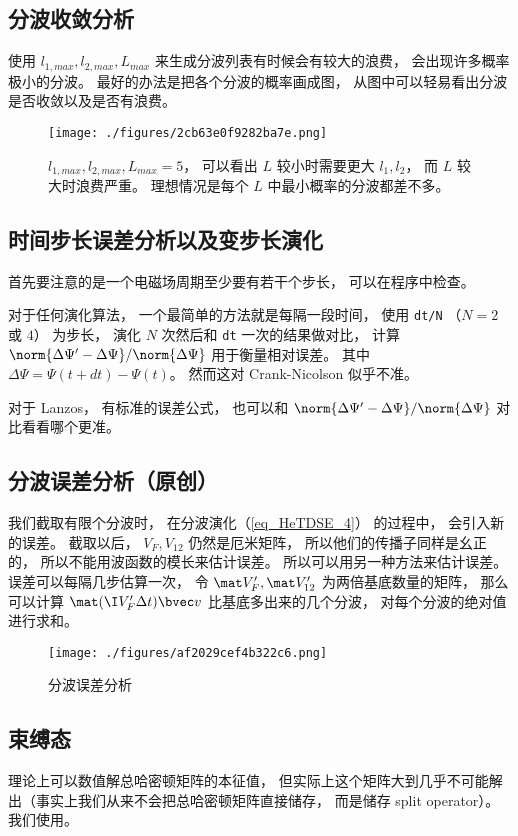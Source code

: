 \subsection{分波收敛分析}
使用 $l_{1,max}, l_{2,max}, L_{max}$ 来生成分波列表有时候会有较大的浪费， 会出现许多概率极小的分波。 最好的办法是把各个分波的概率画成图， 从图中可以轻易看出分波是否收敛以及是否有浪费。
\begin{figure}[ht]
\centering
\texttt{[image: ./figures/2cb63e0f9282ba7e.png]}
\caption{$l_{1,max}, l_{2,max}, L_{max} = 5$， 可以看出 $L$ 较小时需要更大 $l_1, l_2$， 而 $L$ 较大时浪费严重。 理想情况是每个 $L$ 中最小概率的分波都差不多。} \label{fig_HeTDSE_2}
\end{figure}

\subsection{时间步长误差分析以及变步长演化}
首先要注意的是一个电磁场周期至少要有若干个步长， 可以在程序中检查。

对于任何演化算法， 一个最简单的方法就是每隔一段时间， 使用 \verb`dt/N` （$N = 2$ 或 $4$） 为步长， 演化 $N$ 次然后和 \verb`dt` 一次的结果做对比， 计算 $\norm{\Delta \Psi' - \Delta \Psi}/\norm{\Delta \Psi}$ 用于衡量相对误差。 其中 $\Delta\Psi = \Psi(t+dt) - \Psi(t)$。 然而这对 Crank-Nicolson 似乎不准。

对于 Lanzos， 有标准的误差公式， 也可以和 $\norm{\Delta \Psi' - \Delta \Psi}/\norm{\Delta \Psi}$ 对比看看哪个更准。

\subsection{分波误差分析（原创）}
我们截取有限个分波时， 在分波演化（\autoref{eq_HeTDSE_4}） 的过程中， 会引入新的误差。 截取以后， $V_F, V_{12}$ 仍然是厄米矩阵， 所以他们的传播子同样是幺正的， 所以不能用波函数的模长来估计误差。 所以可以用另一种方法来估计误差。 误差可以每隔几步估算一次， 令 $\mat V'_F, \mat V'_{12}$ 为两倍基底数量的矩阵， 那么可以计算 $\mat (\I V'_F\Delta t) \bvec v$ 比基底多出来的几个分波， 对每个分波的绝对值进行求和。
\begin{figure}[ht]
\centering
\texttt{[image: ./figures/af2029cef4b322c6.png]}
\caption{分波误差分析} \label{fig_HeTDSE_1}
\end{figure}

\subsection{束缚态}
理论上可以数值解总哈密顿矩阵的本征值， 但实际上这个矩阵大到几乎不可能解出（事实上我们从来不会把总哈密顿矩阵直接储存， 而是储存 split operator）。 我们使用。

